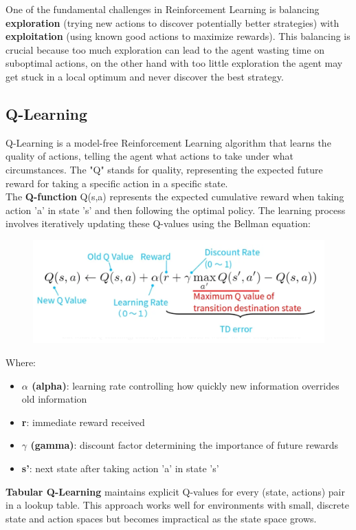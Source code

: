 \documentclass[a4paper,12pt]{article}
\begin{document}
One of the fundamental challenges in Reinforcement Learning is balancing \textbf{exploration} (trying new actions to discover potentially better strategies) with \textbf{exploitation} (using known good actions to maximize rewards). This balancing is crucial because too much exploration can lead to the agent wasting time on suboptimal actions, on the other hand with too little exploration the agent may get stuck in a local optimum and never discover the best strategy.
\subsection{Q-Learning}
Q-Learning is a model-free Reinforcement Learning algorithm that learns the quality of actions, telling the agent what actions to take under what circumstances. The "Q" stands for quality, representing the expected future reward for taking a specific action in a specific state.\\ The \textbf{Q-function} Q(s,a) represents the expected cumulative reward when taking action 'a' in state 's' and then following the optimal policy. The learning process involves iteratively updating these Q-values using the Bellman equation:
\begin{figure}[H]
    \centering
    \includegraphics[scale=0.5]{bellman.png}
\end{figure}
Where:
\begin{itemize}
    \item \textbf{$\alpha$ (alpha)}: learning rate controlling how quickly new information overrides old information
    \item \textbf{r}: immediate reward received
    \item \textbf{$\gamma$ (gamma)}: discount factor determining the importance of future rewards
    \item \textbf{s'}: next state after taking action 'a' in state 's'
\end{itemize}
\textbf{Tabular Q-Learning} maintains explicit Q-values for every (state, actions) pair in a lookup table. This approach works well for environments with small, discrete state and action spaces but becomes impractical as the state space grows.
\end{document}

